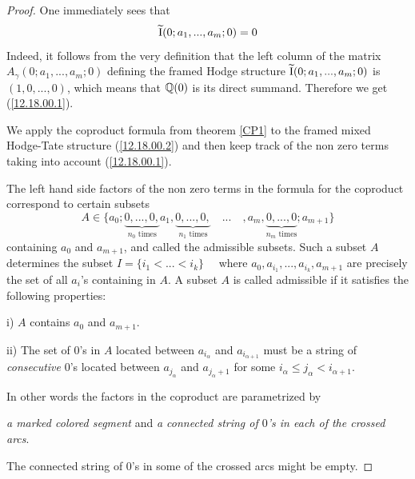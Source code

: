 \documentclass[10pt]{article}
\begin{document}
\begin{proof} One immediately sees that 
\begin{equation} \label{12.18.00.1}
\widetilde {\rm I}(0; a_1, ..., a_m; 0) =0
\end{equation}
Indeed, it follows from the very definition that the left column of the matrix 
$A_{\gamma}(0; a_1, ..., a_m; 0)$ defining 
the framed Hodge structure $\widetilde {\rm I}(0; a_1, ..., a_m; 0)$ is 
$(1, 0, ..., 0)$, which means that ${\mathbb Q}(0)$ 
is its direct summand. Therefore  we get  (\ref{12.18.00.1}). 

We apply the coproduct formula from theorem \ref{CP1} to the framed mixed Hodge-Tate structure 
(\ref{12.18.00.2}) 
and then keep track of the non zero terms taking into account (\ref{12.18.00.1}). 
 
 
The left hand side factors of the non zero terms in the formula for the coproduct 
correspond to certain  subsets
$$
A \in \{a_0; \underbrace{0, ..., 0,}_{\mbox{$n_0$ times}} a_1, 
\underbrace{0, ..., 0,}_{\mbox{$n_1$ times}} \quad ...  \quad , a_m,
 \underbrace{0, ..., 0}_{\mbox{$n_m$ times}}; a_{m+1}   \}
$$ 
containing $a_0$ and $a_{m+1}$, and called the admissible subsets. Such a 
subset $A$ determines the subset 
$
I = \{i_1 < ... < i_k\}\quad 
$
where $a_0, a_{i_1}, ..., a_{i_k}, a_{m+1}$ are precisely the set of all  $a_i$'s 
containing in $A$. 
A subset $A$ is called  admissible if 
 it satisfies the following properties:

i) $A$  contains $a_0$ and $a_{m+1}$.
 
ii) The set of $0$'s in $A$ located between 
$a_{i_{\alpha}}$ and $a_{i_{\alpha+1}}$ must be a string of {\it consecutive} $0$'s located 
between $a_{j_{\alpha}}$ and $a_{j_{\alpha}+1}$ for some $i_{\alpha} \leq j_{\alpha} 
<  i_{{\alpha}+1}$.  


In other words the factors in the coproduct are parametrized by 

{\it a marked colored segment} and 
{\it a connected string of $0$'s in each of the crossed arcs}. 

The connected string of $0$'s in some  of the crossed arcs might be empty. 



\end{proof}
\end{document}
